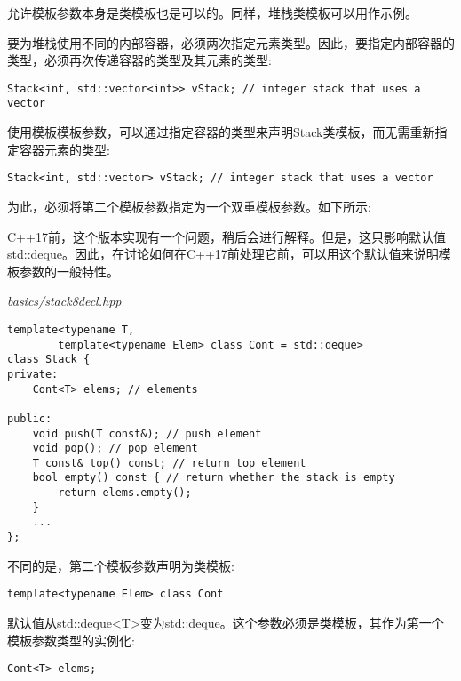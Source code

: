 允许模板参数本身是类模板也是可以的。同样，堆栈类模板可以用作示例。

要为堆栈使用不同的内部容器，必须两次指定元素类型。因此，要指定内部容器的类型，必须再次传递容器的类型及其元素的类型:

\begin{lstlisting}[style=styleCXX]
Stack<int, std::vector<int>> vStack; // integer stack that uses a vector
\end{lstlisting}

使用模板模板参数，可以通过指定容器的类型来声明Stack类模板，而无需重新指定容器元素的类型:

\begin{lstlisting}[style=styleCXX]
Stack<int, std::vector> vStack; // integer stack that uses a vector
\end{lstlisting}

为此，必须将第二个模板参数指定为一个双重模板参数。如下所示:

\begin{tcolorbox}[colback=webgreen!5!white,colframe=webgreen!75!black]
\hspace*{0.75cm}C++17前，这个版本实现有一个问题，稍后会进行解释。但是，这只影响默认值std::deque。因此，在讨论如何在C++17前处理它前，可以用这个默认值来说明模板参数的一般特性。
\end{tcolorbox}

\noindent
\textit{basics/stack8decl.hpp}
\begin{lstlisting}[style=styleCXX]
template<typename T,
		template<typename Elem> class Cont = std::deque>
class Stack {
private:
	Cont<T> elems; // elements
	
public:
	void push(T const&); // push element
	void pop(); // pop element
	T const& top() const; // return top element
	bool empty() const { // return whether the stack is empty
		return elems.empty();
	}
	...
};
\end{lstlisting}

不同的是，第二个模板参数声明为类模板:

\begin{lstlisting}[style=styleCXX]
template<typename Elem> class Cont
\end{lstlisting}

默认值从std::deque<T>变为std::deque。这个参数必须是类模板，其作为第一个模板参数类型的实例化:

\begin{lstlisting}[style=styleCXX]
Cont<T> elems;
\end{lstlisting}

